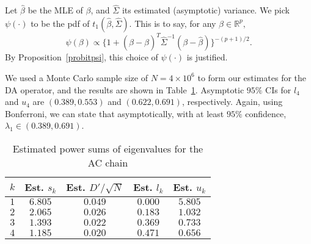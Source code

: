 \documentclass[11pt]{article}
\begin{document}
	Let $\hat{\beta}$ be the MLE of $\beta$, and $\hat{\Sigma}$
        its estimated (asymptotic) variance. We pick $\psi(\cdot)$ to
        be the pdf of $t_1(\hat{\beta},\hat{\Sigma}).$ This is to say,
        for any $\beta \in \mathbb{R}^p,$
	\[
	\psi(\beta) \propto \Big\{ 1 + (\beta-\hat{\beta})^T \hat{\Sigma}^{-1} (\beta-\hat{\beta}) \Big\}^{-(p+1)/2}.
	\]
	By Proposition~\ref{probitpsi}, this choice of $\psi(\cdot)$
        is justified.
	
        We used a Monte Carlo sample size of $N = 4\times 10^6$ to
        form our estimates for the DA operator, and the results are
        shown in Table~\ref{probit}.  Asymptotic $95\%$ CIs for $l_4$
        and $u_4$ are $(0.389,0.553)$ and $(0.622,0.691)$,
        respectively.  Again, using Bonferroni, we can state that
        asymptotically, with at least $95\%$ confidence, $\lambda_1
        \in (0.389, 0.691)$.

	\begin{table}[!h]
		\begin{center} \caption{Estimated power sums of eigenvalues for the AC chain} \label{probit}
             \medskip
			\begin{tabular}{ccccc} 
				$k$ & Est. $s_k$ & Est. $D'/\sqrt{N}$ & Est. $l_k$ & Est. $u_k$ \\ \hline
				$1$ & $6.805$ & $0.049$ & $0.000$ & $5.805$ \\
				$2$ & $2.065$ & $0.026$ & $0.183$ & $1.032$ \\
				$3$ & $1.393$ & $0.022$ & $0.369$ & $0.733$ \\
				$4$ & $1.185$ & $0.020$ & $0.471$ & $0.656$ \\
			\end{tabular}
		\end{center}
	\end{table}
	
\end{document}
